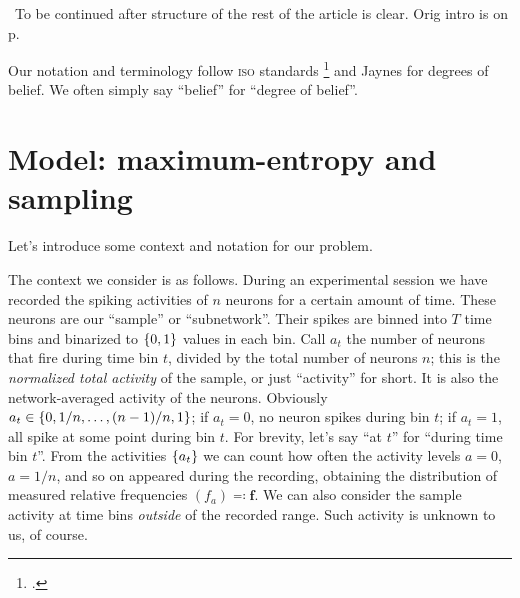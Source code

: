 \documentclass[\ifafour a4paper,12pt,\else a5paper,10pt,\fi%
onecolumn,oneside,article,%
british%
]{memoir}
\theoremstyle{remark}
\theoremstyle{innote}
\newcommand*{\citep}{\footcites}
\newcommand*{\citey}{\parencites*}
\newcommand*{\defs}{\eqqcolon}
\DeclarePairedDelimiter\set{\{}{\}}
\renewcommand*{\|}[1][]{\nonscript\,#1\vert\nonscript\;\mathopen{}}
\newcommand*{\puzzle}{{\fontencoding{U}\fontfamily{fontawesometwo}\selectfont\symbol{225}}}
\newcommand{\mynote}[1]{ {\color{notecolour}\puzzle\ #1}}
\newcommand*{\dob}{degree of belief}
\newcommand*{\dobs}{degrees of belief}
\newcommand*{\yav}{a}
\newcommand*{\yff}{f}
\newcommand*{\yf}{\bm{\yff}}
\newcommand*{\ya}{\yav}%
\begin{document}
\mynote{To be continued after structure of the rest of the article is
  clear. Orig intro is on p.~\pageref{orig_intro}}

Our notation and terminology follow \textsc{iso} standards
\citep{iso1993,iso2006,iso2006b} and Jaynes \citey{jaynes1994_r2003} for
\dobs. We often simply say \enquote{belief} for \enquote{\dob}.


\section{Model: maximum-entropy and sampling}
\label{sec:model}

Let's introduce some context and notation for our problem.

The context we consider is as follows. During an experimental session we
have recorded the spiking activities of $n$ neurons for a certain amount of
time. These neurons are our \enquote{sample} or \enquote{subnetwork}. Their
spikes are binned into $T$ time bins and binarized to $\set{0,1}$ values in
each bin. Call $\ya_{t}$ the number of neurons that fire during time bin
$t$, divided by the total number of neurons $n$; this is the
\emph{normalized total activity} of the sample, or just \enquote{activity}
for short. It is also the network-averaged activity of the neurons.
Obviously $\ya_{t} \in\set{0,1/n,\dotsc,(n-1)/n,1}$; if $\ya_{t}=0$, no
neuron spikes during bin $t$; if $\ya_{t}=1$, all spike at some point
during bin $t$. For brevity, let's say \enquote{at $t$} for \enquote{during
  time bin $t$}. From the activities $\set{\ya_{t}}$ we can count how often
the activity levels $\ya=0$, $\ya=1/n$, and so on appeared during the
recording, obtaining the distribution of measured relative frequencies
$(\yff_{\ya}) \defs \yf$. We can also consider the sample activity at time
bins \emph{outside} of the recorded range. Such activity is unknown to us,
of course.
\end{document}
